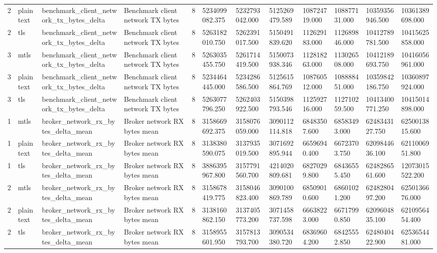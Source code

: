 \begin{longtable}{llllllllllll}
2 & plaintext & benchmark\_client\_network\_tx\_bytes\_delta & Benchmark client network TX bytes & 8 & 5234099082.375 & 5232793042.000 & 5125269479.589 & 108724719.000 & 108877131.000 & 10359356946.500 & 10361389698.000 \\
2 & tls & benchmark\_client\_network\_tx\_bytes\_delta & Benchmark client network TX bytes & 8 & 5263182010.750 & 5262391017.500 & 5150491839.620 & 112629183.000 & 112689846.000 & 10412789781.500 & 10415625858.000 \\
3 & mtls & benchmark\_client\_network\_tx\_bytes\_delta & Benchmark client network TX bytes & 8 & 5263035455.750 & 5261714419.500 & 5150073938.346 & 112818263.000 & 113026508.000 & 10412189693.750 & 10416056961.000 \\
3 & plaintext & benchmark\_client\_network\_tx\_bytes\_delta & Benchmark client network TX bytes & 8 & 5234464445.000 & 5234286586.500 & 5125615864.769 & 108760512.000 & 108888451.000 & 10359842186.750 & 10360897924.000 \\
3 & tls & benchmark\_client\_network\_tx\_bytes\_delta & Benchmark client network TX bytes & 8 & 5263077796.250 & 5262403922.500 & 5150398793.546 & 112592716.000 & 112710259.500 & 10413400771.250 & 10415014898.000 \\
1 & mtls & broker\_network\_rx\_bytes\_delta\_mean & Broker network RX bytes mean & 8 & 3158669692.375 & 3158076059.000 & 3090112114.818 & 68483507.600 & 68583493.000 & 6248343127.750 & 6250013815.600 \\
1 & plaintext & broker\_network\_rx\_bytes\_delta\_mean & Broker network RX bytes mean & 8 & 3138380590.075 & 3137935019.500 & 3071692895.944 & 66596940.400 & 66723703.750 & 6209844636.100 & 6211006951.800 \\
1 & tls & broker\_network\_rx\_bytes\_delta\_mean & Broker network RX bytes mean & 8 & 3886395967.800 & 3157791560.700 & 4214020809.681 & 68270299.800 & 68436555.450 & 6248286561.600 & 12073015522.200 \\
2 & mtls & broker\_network\_rx\_bytes\_delta\_mean & Broker network RX bytes mean & 8 & 3158678419.775 & 3158046823.400 & 3090100869.789 & 68509010.600 & 68601021.200 & 6248280497.200 & 6250136676.000 \\
2 & plaintext & broker\_network\_rx\_bytes\_delta\_mean & Broker network RX bytes mean & 8 & 3138160862.150 & 3137405773.200 & 3071458737.598 & 66638223.000 & 66717990.850 & 6209604835.100 & 6210956454.400 \\
2 & tls & broker\_network\_rx\_bytes\_delta\_mean & Broker network RX bytes mean & 8 & 3158955601.950 & 3157813793.700 & 3090534380.720 & 68369604.200 & 68425552.850 & 6248040422.900 & 6253654481.000 \\

\end{longtable}
